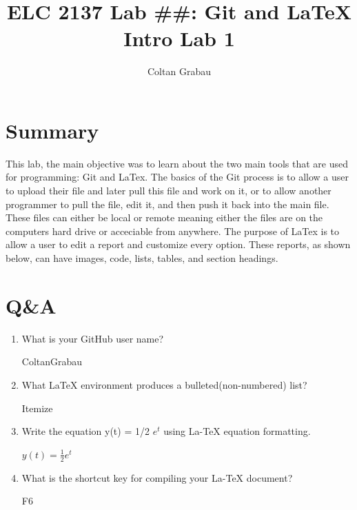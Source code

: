 \documentclass[11pt]{article}
\begin{document}
	
	\title{ELC 2137 Lab \#\#: Git and LaTeX Intro Lab 1}
	\author{Coltan Grabau}
	
	\maketitle
	
	
	\section*{Summary}
	
	This lab, the main objective was to learn about the two main tools that are used for programming: Git and LaTex. The basics of the Git process is to allow a user to upload their file and later pull this file and work on it, or to allow another programmer to pull the file, edit it, and then push it back into the main file. These files can either be local or remote meaning either the files are on the computers hard drive or acceciable from anywhere. The purpose of LaTex is to allow a user to edit a report and customize every option. These reports, as shown below, can have images, code, lists, tables, and section headings.
	
	
	\section*{Q\&A}
	
	\begin{enumerate}
		\item What is your GitHub user name?
		
		ColtanGrabau
		
		\item What  LaTeX  environment  produces  a  bulleted(non-numbered) list?
		
		Itemize 
		
		\item Write  the  equation y(t) = 1/2 $e^t$ using  La-TeX equation formatting.
		
		$y(t) = \frac{1}{2}e^t$
		
		\item What is the shortcut key for compiling your La-TeX document?
		
		F6
		
	\end{enumerate}
	
	
\end{document}
